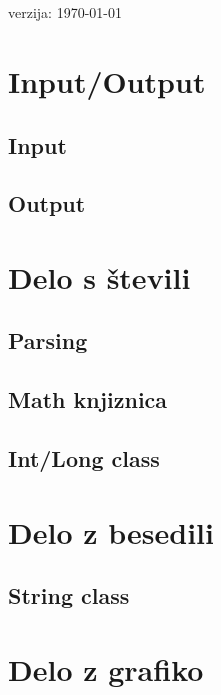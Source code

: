 \documentclass[a4paper,oneside,12pt]{article}
\title{\mytitle}
\author{Rok Kos}
\date{\today}
\theoremstyle{definition}
\begin{document}
\thispagestyle{empty}

\vspace*{\fill}
\begin{center}
  \\[6ex]
  \\[4ex]
  \vfill
  verzija: \today
\end{center}

\newpage

\tableofcontents
\listoffigures

\newpage

\section{Input/Output}
	\subsection{Input}
	\subsection{Output}
\section{Delo s števili}
	\subsection{Parsing}
	\subsection{Math knjiznica}
	\subsection{Int/Long class}
\section{Delo z besedili}
	\subsection{String class}

\section{Delo z grafiko}
\end{document}
